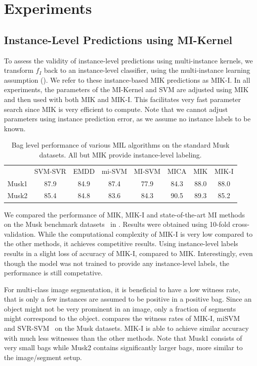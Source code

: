 \section{Experiments}

\subsection{Instance-Level Predictions using MI-Kernel}

To assess the validity of instance-level predictions using multi-instance
kernels, we transform $f_{I}$ back to an instance-level classifier, using the
multi-instance learning assumption (). We refer to these
instance-based MIK predictions as MIK-I. In all experiments, the
parameters of the MI-Kernel and SVM are adjusted using MIK and then used with
both MIK and MIK-I.  This facilitates very fast parameter search since
MIK is very efficient to compute. Note that we cannot adjust parameters using
instance prediction error, as we assume no instance labels to be known.

\begin{table}
    \centering
    \begin{tabularx}{\linewidth}{@{\extracolsep{\fill}}lccccccc}
    \toprule
        & SVM-SVR & EMDD & mi-SVM & MI-SVM & MICA & MIK & MIK-I \\
    \cmidrule(rl){2-8}
    Musk1 & 87.9 &84.9 &  87.4 &  77.9     & 84.3 & 88.0& 88.0 \\
    Musk2 & 85.4 &84.8 &  83.6 &  84.3     & 90.5 & 89.3& 85.2 \\
    \bottomrule
    \end{tabularx}
    \caption{Bag level performance of various MIL algorithms on the standard Musk
    datasets. All but MIK provide instance-level labeling.}
    
\end{table}
We compared the performance of MIK, MIK-I and state-of-the-art MI
methods on the Musk benchmark datasets~\citep{dietterich1997solving} in
. Results were obtained using 10-fold cross-validation. While
the computational complexity of MIK-I is very low compared to the other
methods, it achieves competitive results.  Using instance-level labels results
in a slight loss of accuracy of MIK-I, compared to MIK\@. Interestingly, even
though the model was not trained to provide any instance-level labels, the
performance is still competative.

For multi-class image segmentation, it is beneficial to have a low witness
rate, that is only a few instances are assumed to be positive in a positive
bag. Since an object might not be very prominent in an image, only a fraction
of segments might correspond to the object.
 compares the witness rates of MIK-I,
miSVM~\citep{andrews2003support} and SVR-SVM~\citep{liconvex2010} on the Musk
datasets. MIK-I is able to achieve similar accuracy with much less
witnesses than the other methods.  Note that Musk1 consists of very small bags
while Musk2 contains significantly larger bags, more similar to the
image/segment setup.

